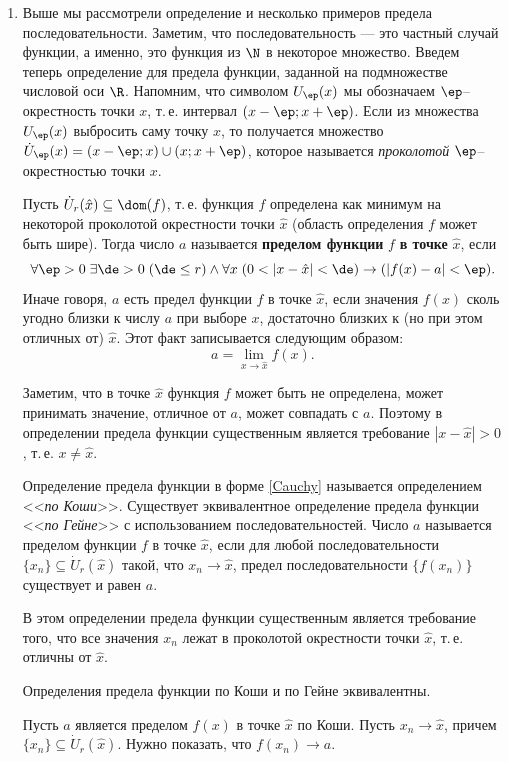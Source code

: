 \begin{enumerate}
\item Выше мы рассмотрели определение и несколько примеров предела последовательности. Заметим, что последовательность --- это частный случай функции, а именно, это функция из $\N$ в некоторое множество. Введем теперь определение для предела функции, заданной на подмножестве числовой оси $\R$. Напомним, что символом $U_\ep(x)$ мы обозначаем $\ep$--окрестность точки $x$, т.\,е. интервал $(x-\ep;x+\ep)$. Если из множества $U_\ep(x)$ выбросить саму точку $x$, то получается множество $\dot{U}_\ep(x)=(x-\ep;x)\cup(x;x+\ep)$, которое называется \textit{проколотой} $\ep$--окрестностью точки $x$.

Пусть $\dot U_r(\hat x)\subseteq \dom(f)$, т.\,е. функция $f$ определена как минимум на некоторой проколотой окрестности точки $\hat x$ (область определения $f$ может быть шире). Тогда число $a$ называется \textbf{пределом функции} $f$ \textbf{в точке} $\hat x$, если
\begin{equation}\label{Cauchy}
\forall\ep>0\;\exists\de>0\;(\de\le r)\land\forall x\;(0<|x-\hat x|<\de) \to (|f(x)-a|<\ep).
\end{equation}
Иначе говоря, $a$ есть предел функции $f$ в точке $\hat x$, если значения $f(x)$ сколь угодно близки к числу $a$ при выборе $x$, достаточно близких к (но при этом отличных от) $\hat x$. Этот факт записывается следующим образом:
$$
a=\lim_{x\to \hat x}f(x).
$$

Заметим, что в точке $\hat x$ функция $f$ может быть не определена, может принимать значение, отличное от $a$, может совпадать с $a$. Поэтому в определении предела функции существенным является требование $|x-\hat x|>0$, т.\,е. $x\ne \hat x$.

Определение предела функции в форме \eqref{Cauchy} называется определением <<\textit{по Коши}>>. Существует эквивалентное определение предела функции <<\textit{по Гейне}>> с использованием последовательностей. Число $a$ называется пределом функции $f$ в точке $\hat x$, если для любой последовательности $\{x_n\}\subseteq \dot U_r(\hat x)$ такой, что $x_n\to \hat x$, предел последовательности $\{f(x_n)\}$ существует и равен $a$.

В этом определении предела функции существенным является требование того, что все значения $x_n$ лежат в проколотой окрестности точки $\hat x$, т.\,е. отличны от $\hat x$.

\begin{thrm}\label{Cauchy-Geine}
Определения предела функции по Коши и по Гейне эквивалентны.
\end{thrm}
\pf
Пусть $a$ является пределом $f(x)$ в точке $\hat x$ по Коши. Пусть $x_n\to\hat x$, причем $\{x_n\}\subseteq \dot U_r(\hat x)$. Нужно показать, что $f(x_n)\to a$.


\end{enumerate}
